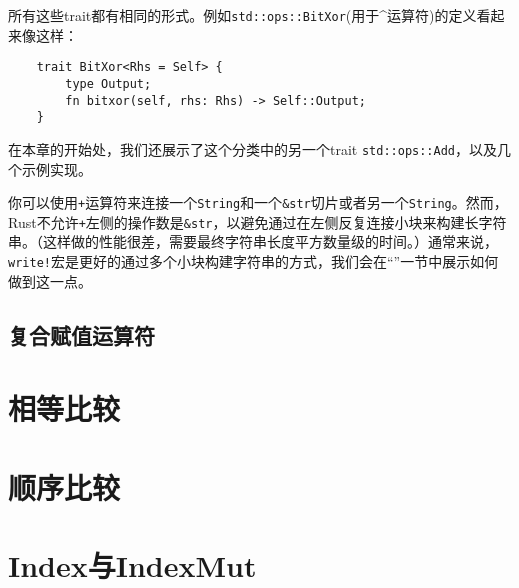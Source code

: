所有这些trait都有相同的形式。例如\texttt{std::ops::BitXor}(用于\^{}运算符)的定义看起来像这样：
\begin{verbatim}
    trait BitXor<Rhs = Self> {
        type Output;
        fn bitxor(self, rhs: Rhs) -> Self::Output;
    }
\end{verbatim}

在本章的开始处，我们还展示了这个分类中的另一个trait \texttt{std::ops::Add}，以及几个示例实现。

你可以使用\texttt{+}运算符来连接一个\texttt{String}和一个\texttt{\&str}切片或者另一个\texttt{String}。然而，Rust不允许\texttt{+}左侧的操作数是\texttt{\&str}，以避免通过在左侧反复连接小块来构建长字符串。（这样做的性能很差，需要最终字符串长度平方数量级的时间。）通常来说，\texttt{write!}宏是更好的通过多个小块构建字符串的方式，我们会在“”一节中展示如何做到这一点。

\subsection{复合赋值运算符}\label{assign}

\section{相等比较}\label{equal}

\section{顺序比较}\label{cmp}

\section{Index与IndexMut}\label{index}
